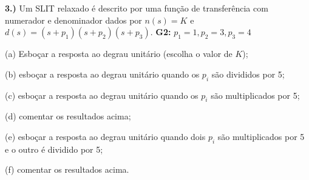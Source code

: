 \documentclass{article}
\begin{document}
\vspace{\baselineskip}

\textbf{3.)} Um SLIT relaxado é descrito por uma função de transferência com numerador e denominador dados por $n(s) = K$ e $d(s) = (s + p_1)(s + p_2)(s + p_3)$.
\textbf{G2:} $p_1 = 1, p_2 = 3, p_3 = 4$

(a) Esboçar a resposta ao degrau unitário (escolha o valor de $K$);

(b) esboçar a resposta ao degrau unitário quando os $p_i$ são divididos por 5;

(c) esboçar a resposta ao degrau unitário quando os $p_i$ são multiplicados por 5;

(d) comentar os resultados acima;

(e) esboçar a resposta ao degrau unitário quando dois $p_i$ são multiplicados por 5 e o outro é dividido por 5;

(f) comentar os resultados acima.
\end{document}
